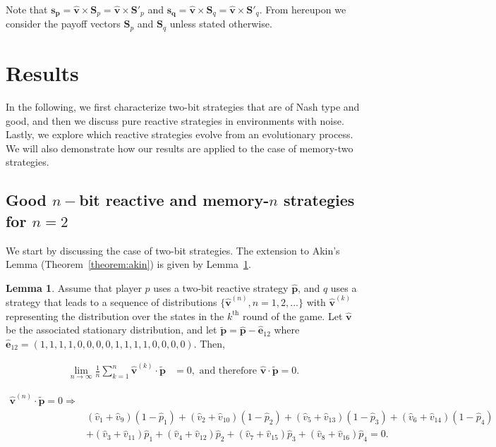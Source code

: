 \documentclass{article}
\theoremstyle{definition}
\newtheorem{lemma}[theorem]{Lemma}
\begin{document}
Note that \(\mathbf{s_{p}} = \mathbf{\hat{v}} \times \mathbf{S}_{p} =
\mathbf{\hat{v}} \times \mathbf{S}'_{p}\) and \(\mathbf{s_{q}} =\mathbf{\hat{v}}
\times \mathbf{S}_{q} = \mathbf{\hat{v}} \times \mathbf{S}'_{q}\). From
hereupon we consider the payoff vectors \(\mathbf{S}_{p}\) and
\(\mathbf{S}_{q}\) unless stated otherwise.

\section{Results}\label{section:results}

In the following, we first characterize two-bit strategies that
are of Nash type and good, and then we discuss pure reactive strategies in
environments with noise. Lastly, we explore which reactive strategies evolve
from an evolutionary process. We will also demonstrate how our results
are applied to the case of memory-two strategies.

\subsection{Good \(n-\)bit reactive and memory-\(n\) strategies for
\(n=2\)}\label{section:good_nash_strategies}

We start by discussing the case of two-bit strategies. The extension to Akin's
Lemma (Theorem~\ref{theorem:akin}) is given by Lemma~\ref{lemma:akin_extended}.

\begin{lemma}\label{lemma:akin_extended}
  Assume that player \(p\) uses a two-bit reactive strategy \(\mathbf{\hat{p}}\),
  and \(q\) uses a strategy that leads to a sequence
  of distributions \(\{\mathbf{\hat{v}}^{(n)}, n = 1, 2, ...\}\) with
  \(\mathbf{\hat{v}}^{(k)}\) representing the distribution over the states in the
  \(k^{\text{th}}\) round of the game. Let \(\mathbf{\hat{v}}\) be the associated
  stationary distribution, and let \(\mathbf{\tilde{p}} = \mathbf{\hat{p}} - \mathbf{\hat{e}}_{1 2}\)
  where \(\mathbf{\hat{e}}_{1 2} = (1, 1, 1, 1, \allowbreak 0,
  0, 0, 0, 1, 1, 1, 1, 0, 0, 0, 0)\). Then,

  \begin{align*}
    \lim_{n \rightarrow \infty} \frac{1}{n} \sum_{k=1}^{n} \mathbf{\hat{v}}^{(k)} \cdot\mathbf{\tilde{p}} & = 0, \text{ and therefore } \mathbf{\hat{v}} \cdot \mathbf{\tilde{p}} = 0.
  \end{align*}

  \begin{align}\label{eq:akin_extended}
  \mathbf{\hat{v}}^{(n)} \cdot \mathbf{\tilde{p}} = 0 \Rightarrow & \nonumber \\
  & (\hat{v}_{1} + \hat{v}_{9}) (1 - \hat{p}_1) + (\hat{v}_{2} + \hat{v}_{10}) (1 - \hat{p}_2)  + (\hat{v}_{5} + \hat{v}_{13}) (1 - \hat{p}_3) + (\hat{v}_{6} + \hat{v}_{14}) (1 - \hat{p}_4) \nonumber \\
  & + (\hat{v}_{3} + \hat{v}_{11})\hat{p}_1  + (\hat{v}_{4} + \hat{v}_{12})\hat{p}_2 + (\hat{v}_{7} + \hat{v}_{15}) \hat{p}_3 + (\hat{v}_{8} + \hat{v}_{16}) \hat{p}_4 = 0.
  \end{align}
\end{lemma}
\end{document}
